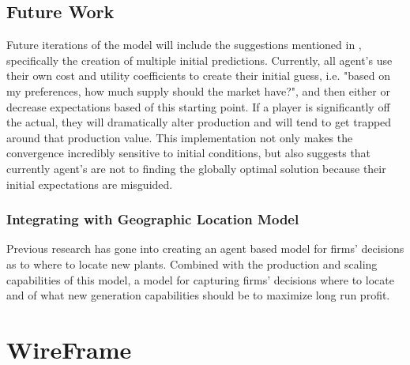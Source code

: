 \documentclass[12pt]{article}
\begin{document}
\subsection{Future Work}
Future iterations of the model will include the suggestions mentioned in , specifically the creation of multiple initial predictions. Currently, all agent's use their own cost and utility coefficients to create their initial guess, i.e. "based on my preferences, how much supply should the market have?", and then either  or decrease expectations based of this starting point. If a player is significantly off the actual, they will dramatically alter production and will tend to get trapped around that production value. This implementation not only makes the convergence incredibly sensitive to initial conditions, but also suggests that currently agent's are not to finding the globally optimal solution because their initial expectations are misguided. \*

\subsubsection{Integrating with Geographic Location Model}
Previous research has gone into creating an agent based model for firms' decisions as to where to locate new plants. Combined with the production and scaling capabilities of this model, a model for capturing firms' decisions where to locate and of what new generation capabilities should be to maximize long run profit. 


\newpage
\appendix

	\section{WireFrame}
\end{document}
